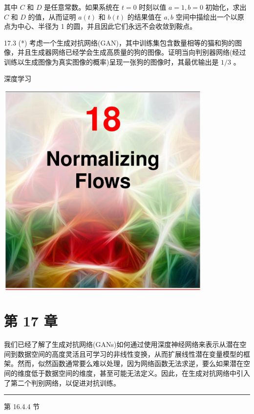 \documentclass[10pt]{report}
\newcommand{\HRule}{\begin{center}\rule{0.9\linewidth}{0.2mm}\end{center}}
\begin{document}
其中 \(C\) 和 \(D\) 是任意常数。如果系统在 \(t = 0\) 时刻以值 \(a = 1,b = 0\) 初始化，求出 \(C\) 和 \(D\) 的值，从而证明 \(a\left( t\right)\) 和 \(b\left( t\right)\) 的结果值在 \(a,b\) 空间中描绘出一个以原点为中心、半径为 1 的圆，并且因此它们永远不会收敛到鞍点。

17.3 (*) 考虑一个生成对抗网络(GAN)，其中训练集包含数量相等的猫和狗的图像，并且生成器网络已经学会生成高质量的狗的图像。证明当向判别器网络(经过训练以生成图像为真实图像的概率)呈现一张狗的图像时，其最优输出是 \(1/3\) 。

深度学习

\begin{center}
\includegraphics[max width=0.8\textwidth]{images/0194e279-9b28-703a-88f4-c3ac21e2010d_566_473_348_1076_1089_0.jpg}
\end{center}
\hspace*{3em} 

\section*{第 17 章}

我们已经了解了生成对抗网络(GANs)如何通过使用深度神经网络来表示从潜在空间到数据空间的高度灵活且可学习的非线性变换，从而扩展线性潜在变量模型的框架。然而，似然函数通常要么难以处理，因为网络函数无法求逆，要么如果潜在空间的维度低于数据空间的维度，甚至可能无法定义。因此，在生成对抗网络中引入了第二个判别网络，以促进对抗训练。

\HRule

第 16.4.4 节
\end{document}
